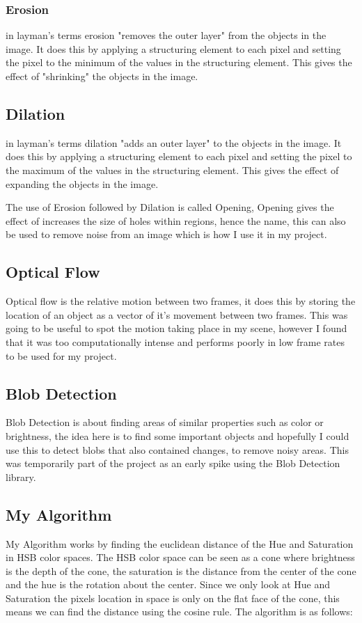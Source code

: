 \documentclass[a4paper]{report}
\begin{document}
\subsubsection{Erosion}
in layman's terms erosion "removes the outer layer" from the objects in the image. It does this by applying a structuring element to each pixel and setting the pixel to the minimum of the values in the structuring element. This gives the effect of "shrinking" the objects in the image.

\subsection{Dilation}
in layman's terms dilation "adds an outer layer" to the objects in the image. It does this by applying a structuring element to each pixel and setting the pixel to the maximum of the values in the structuring element. This gives the effect of expanding the objects in the image.

The use of Erosion followed by Dilation is called Opening, Opening gives the effect of increases the size of holes within regions, hence the name, this can also be used to remove noise from an image which is how I use it in my project.

\subsection{Optical Flow}
Optical flow is the relative motion between two frames, it does this by storing the location of an object as a vector of it's movement between two frames. This was going to be useful to spot the motion taking place in my scene, however I found that it was too computationally intense and performs poorly in low frame rates to be used for my project.

\subsection{Blob Detection}
Blob Detection is about finding areas of similar properties such as color or brightness, the idea here is to find some important objects and hopefully I could use this to detect blobs that also contained changes, to remove noisy areas. This was temporarily part of the project as an early spike using the Blob Detection library\cite{BLOB}.

\subsection{My Algorithm}
My Algorithm works by finding the euclidean distance of the Hue and Saturation in HSB color spaces. The HSB color space can be seen as a cone where brightness is the depth of the cone, the saturation is the distance from the center of the cone and the hue is the rotation about the center. Since we only look at Hue and Saturation the pixels location in space is only on the flat face of the cone, this means we can find the distance using the cosine rule. The algorithm is as follows:
\end{document}
